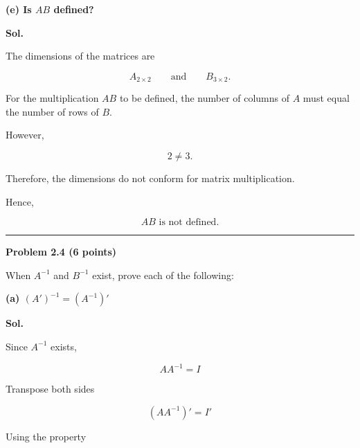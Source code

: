 \documentclass[12pt]{article}
\begin{document}
\vspace{1cm}

\noindent
\textbf{(e) Is \(AB\) defined?}

\vspace{0.5cm}

\noindent
\textbf{Sol.}

\vspace{0.3cm}

\noindent
The dimensions of the matrices are

\[
A_{2\times2}
\qquad\text{and}\qquad
B_{3\times2}.
\]

\noindent
For the multiplication \(AB\) to be defined, the number of columns of \(A\) must equal the number of rows of \(B\).

\vspace{0.3cm}

\noindent
However,

\[
2\neq3.
\]

\vspace{0.7cm}

\noindent
Therefore, the dimensions do not conform for matrix multiplication.

\noindent
Hence,

\[
\boxed{
AB\text{ is not defined.}
}
\]

\vspace{1cm}

\hrule

\vspace{0.7cm}

\noindent
\textbf{Problem 2.4 (6 points)}

\vspace{0.5cm}

\noindent
When \(A^{-1}\) and \(B^{-1}\) exist, prove each of the following:

\vspace{0.5cm}

\noindent
\textbf{(a) \((A')^{-1}=(A^{-1})'\)}

\vspace{0.5cm}

\noindent
\textbf{Sol.}

\vspace{0.3cm}

\noindent
Since \(A^{-1}\) exists,

\[
AA^{-1}=I
\]

\noindent
Transpose both sides

\[
(AA^{-1})'=I'
\]

\noindent
Using the property
\end{document}
